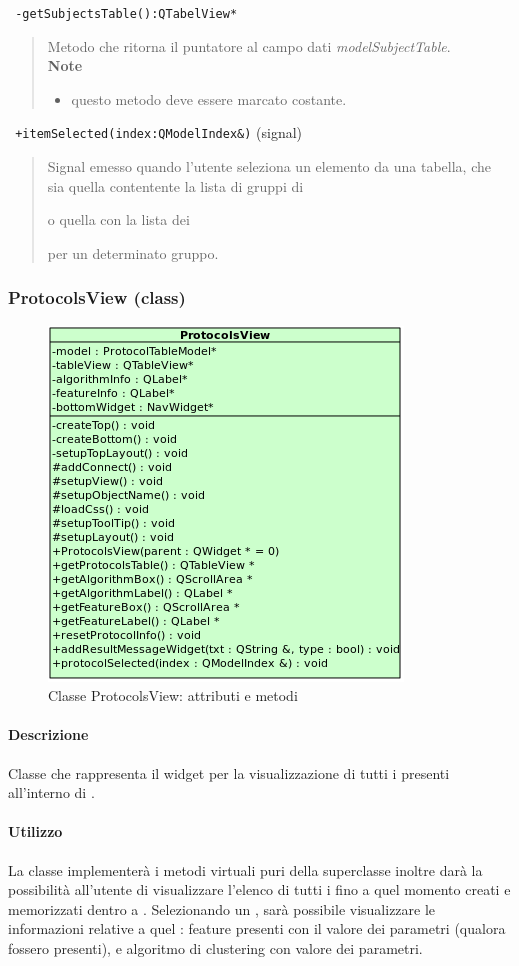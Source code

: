 \color{blue}\verb! -getSubjectsTable():QTabelView*!
\begin{quote}
\color{black}Metodo che ritorna il puntatore al campo dati \emph{modelSubjectTable}.\\
 \textbf{Note}
 \begin{itemize}
 \item questo metodo deve essere marcato costante.
 \end{itemize}
\end{quote}
\color{blue}\verb! +itemSelected(index:QModelIndex&)! (signal)
\color{black} 
\begin{quote}
Signal\g{} emesso quando l'utente seleziona un elemento da una tabella, che sia quella contentente la lista di gruppi di \subject{} o quella con la lista dei \subject{} per un determinato gruppo.
\end{quote}
\pagebreak
\color{black}
\subsubsection{ProtocolsView (class)}
\label{speproV}
\begin{figure}[!h]
\centering
			\includegraphics[width=0.5\linewidth]{./Content/Immagini/view/ProtocolsView.png}
			\caption{Classe ProtocolsView: attributi e metodi}
			\label{cl_proview}
\end{figure}
\paragraph{Descrizione \\}
Classe che rappresenta il widget per la visualizzazione di tutti i \protocol{} presenti all'interno di \project.
\paragraph{Utilizzo\\}
La classe implementerà i metodi virtuali puri della superclasse inoltre darà la possibilità all'utente di visualizzare l'elenco di tutti i \protocol{} fino a quel momento creati e memorizzati dentro a \project. Selezionando un \protocol{}, sarà possibile visualizzare le informazioni relative a quel \protocol{}: feature\g{} presenti con il valore dei parametri (qualora fossero presenti), e algoritmo di clustering\g{} con valore dei parametri.
